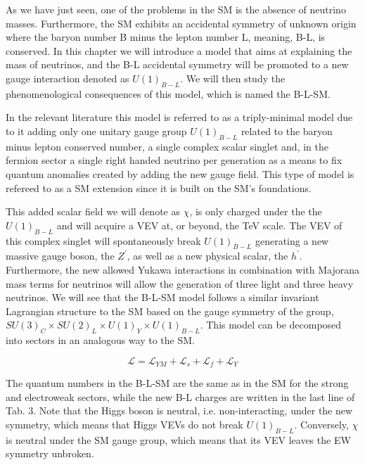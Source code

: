 \documentclass[12pt]{article}
\begin{document}
As we have just seen, one of the problems in the SM is the absence of neutrino masses. Furthermore, the SM exhibits an accidental symmetry of unknown origin where the baryon number B minus the lepton number L, meaning, B-L, is conserved. In this chapter we will introduce a model that aims at explaining the mass of neutrinos, and the B-L accidental symmetry will be promoted to a new gauge interaction denoted as $U(1)_{B-L}$. We will then study the phenomenological consequences of this model, which is named the B-L-SM.

In the relevant literature this model is referred to as a triply-minimal model due to it adding only one unitary gauge group $U(1)_{B-L}$ related to the baryon minus lepton conserved number, a single complex scalar singlet and, in the fermion sector a single right handed neutrino per generation as a means to fix quantum anomalies created by adding the new gauge field. This type of model is refereed to as a SM extension since it is built on the SM's foundations. 

This added scalar field we will denote as $\chi$, is only charged under the  the $U(1)_{B-L}$ and will acquire a VEV at, or beyond, the TeV scale. The VEV of this complex singlet will spontaneously break $U(1)_{B-L}$ generating a new massive gauge boson, the $Z^\prime$, as well as a new physical scalar, the $h^\prime$. Furthermore, the new allowed Yukawa interactions in combination with Majorana mass terms for neutrinos will allow the generation of three light and three heavy neutrinos.
%
We will see that the B-L-SM model follows a similar invariant Lagrangian structure to the SM based on the gauge symmetry of the group, $ SU(3)_C  \times SU(2)_L \times U(1)_Y \times U(1)_{B-L}$.  This model can be decomposed into sectors in an analogous way to the SM. 

\begin{equation}
\mathcal{L}=\mathcal{L}_{YM}+\mathcal{L}_s+\mathcal{L}_f+\mathcal{L}_Y
\end{equation}

The quantum numbers in the B-L-SM are the same as in the SM for the strong and electroweak sectors, while the new B-L charges are written in the last line of Tab. 3. Note that the Higgs boson is neutral, i.e. non-interacting, under the new symmetry, which means that Higgs VEVs do not break $U(1)_{B-L}$.  Conversely, $\chi$ is neutral under the SM gauge group, which means that its VEV leaves the EW symmetry unbroken.
\end{document}
